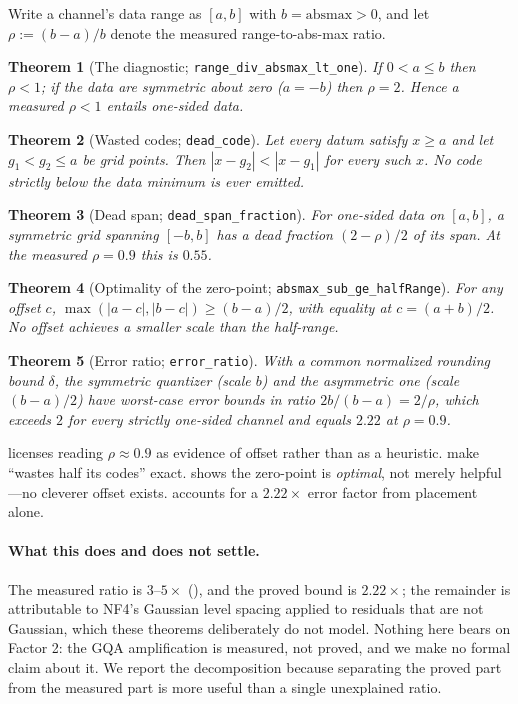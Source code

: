 \documentclass{article}
\theoremstyle{plain}
\newtheorem{theorem}{Theorem}
\theoremstyle{definition}
\newcommand{\absmax}{\mathrm{absmax}}
\begin{document}
Write a channel's data range as $[a,b]$ with $b = \absmax > 0$, and let
$\rho := (b-a)/b$ denote the measured range-to-abs-max ratio.

\begin{theorem}[The diagnostic; \texttt{range\_div\_absmax\_lt\_one}]
\label{thm:diag}
If $0 < a \le b$ then $\rho < 1$; if the data are symmetric about zero ($a = -b$) then
$\rho = 2$. Hence a measured $\rho < 1$ \emph{entails} one-sided data.
\end{theorem}

\begin{theorem}[Wasted codes; \texttt{dead\_code}]
\label{thm:dead}
Let every datum satisfy $x \ge a$ and let $g_1 < g_2 \le a$ be grid points. Then
$|x-g_2| < |x-g_1|$ for every such $x$. No code strictly below the data minimum is ever
emitted.
\end{theorem}

\begin{theorem}[Dead span; \texttt{dead\_span\_fraction}]
\label{thm:span}
For one-sided data on $[a,b]$, a symmetric grid spanning $[-b,b]$ has a dead fraction
$(2-\rho)/2$ of its span. At the measured $\rho = 0.9$ this is $0.55$.
\end{theorem}

\begin{theorem}[Optimality of the zero-point; \texttt{absmax\_sub\_ge\_halfRange}]
\label{thm:opt}
For any offset $c$, $\max(|a-c|,|b-c|) \ge (b-a)/2$, with equality at $c = (a+b)/2$. No offset
achieves a smaller scale than the half-range.
\end{theorem}

\begin{theorem}[Error ratio; \texttt{error\_ratio}]
\label{thm:ratio}
With a common normalized rounding bound $\delta$, the symmetric quantizer (scale $b$) and the
asymmetric one (scale $(b-a)/2$) have worst-case error bounds in ratio $2b/(b-a) = 2/\rho$,
which exceeds $2$ for every strictly one-sided channel and equals $2.22$ at $\rho = 0.9$.
\end{theorem}

 licenses reading $\rho \approx 0.9$ as evidence of offset rather than as a
heuristic.  make ``wastes half its codes'' exact.  shows
the zero-point is \emph{optimal}, not merely helpful---no cleverer offset exists.
 accounts for a $2.22\times$ error factor from placement alone.

\paragraph{What this does and does not settle.}
The measured ratio is $3$--$5\times$ (), and the proved bound is
$2.22\times$; the remainder is attributable to NF4's Gaussian level spacing applied to
residuals that are not Gaussian, which these theorems deliberately do not model. Nothing here
bears on Factor 2: the GQA amplification is measured, not proved, and we make no formal claim
about it. We report the decomposition because separating the proved part from the measured part
is more useful than a single unexplained ratio.
\end{document}
